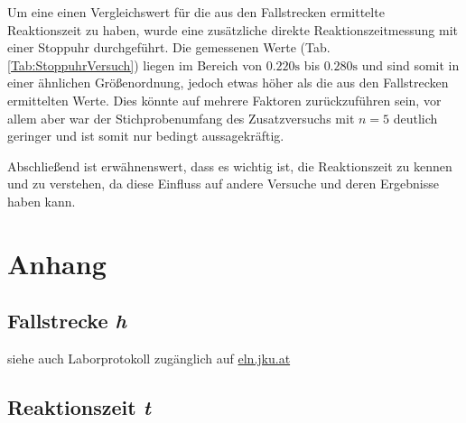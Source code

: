 \documentclass[a4paper,12pt]{article}
\begin{document}
Um eine einen Vergleichswert für die aus den Fallstrecken ermittelte Reaktionszeit zu haben, wurde
eine zusätzliche direkte Reaktionszeitmessung mit einer Stoppuhr durchgeführt. Die gemessenen Werte
(Tab. \ref{Tab:StoppuhrVersuch}) liegen im Bereich von $0.220\mathrm{s}$ bis $0.280\mathrm{s}$ und
sind somit in einer ähnlichen Größenordnung, jedoch etwas höher als die aus den Fallstrecken ermittelten
Werte. Dies könnte auf mehrere Faktoren zurückzuführen sein, vor allem aber war der Stichprobenumfang
des Zusatzversuchs mit $n=5$ deutlich geringer und ist somit nur bedingt aussagekräftig.

Abschließend ist erwähnenswert, dass es wichtig ist, die Reaktionszeit zu kennen und zu verstehen,
da diese Einfluss auf andere Versuche und deren Ergebnisse haben kann.



\newpage
\section{Anhang}
\subsection{Fallstrecke \textit{h}}
\label{AnahangFallstrecke}

siehe auch Laborprotokoll zugänglich auf \url{eln.jku.at}




\newpage
\subsection{Reaktionszeit \textit{t}}
\label{AnahangReaktionszeit}


\end{document}

